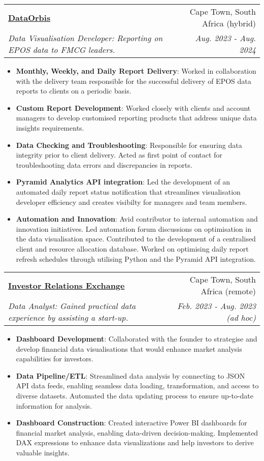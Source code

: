 \documentclass[a4paper,11pt]{article}
\makeatletter
\newcommand{\resumeItem}[2]{
  \item\small{
    \textbf{#1}{: #2 \vspace{-2pt}}
  }
}
\newcommand{\resumeSubheading}[4]{
  \vspace{-1pt}\item
    \begin{tabular*}{0.97\textwidth}[t]{l@{\extracolsep{\fill}}r}
      \textbf{#1} & #2 \\
      \textit{\small#3} & \textit{\small #4} \\
  \end{tabular*}\vspace{-10pt}
}
\newcommand{\resumeItemListStart}{\begin{itemize}}
\newcommand{\resumeItemListEnd}{\end{itemize}\vspace{-10pt}}
\makeatother
\begin{document}
    \resumeSubheading
      {\href{http://dataorbis.com}{DataOrbis}}{Cape Town, South Africa (hybrid)}
      {Data Visualisation Developer: Reporting on EPOS data to FMCG leaders.}{Aug. 2023 - Aug. 2024}
    
      \resumeItemListStart
        \resumeItem{Monthly, Weekly, and Daily Report Delivery}
          {Worked in collaboration with the delivery team responsible for the successful delivery of EPOS data reports to clients on a periodic basis.}
        \resumeItem{Custom Report Development}
          {Worked closely with clients and account managers to develop customised reporting products that address unique data insights requirements.}
        \resumeItem{Data Checking and Troubleshooting}
          {Responsible for ensuring data integrity prior to client delivery. Acted as first point of contact for troubleshooting data errors and discrepancies in reports.}
        \resumeItem{Pyramid Analytics API integration}
          {Led the development of an automated daily report status notification that streamlines visualisation developer efficiency and creates visibilty for managers and team members.}
        \resumeItem{Automation and Innovation}
          {Avid contributor to internal automation and innovation initiatives. Led automation forum discussions on optimisation in the data visualisation space. Contributed to the development of a centralised client and resource allocation database. Worked on optimising daily report refresh schedules through utilising Python and the Pyramid API integration.}
      \resumeItemListEnd

    \resumeSubheading
      {\href{http://irx.exchange/metals-gold}{Investor Relations Exchange}}{Cape Town, South Africa (remote)}
      {Data Analyst: Gained practical data experience by assisting a start-up.}{Feb. 2023 - Aug. 2023 (ad hoc)}
      
      \resumeItemListStart
        \resumeItem{Dashboard Development}
          {Collaborated with the founder to strategise and develop financial data visualisations that would enhance market analysis capabilities for investors.}
        \resumeItem{Data Pipeline/ETL}
          {Streamlined data analysis by connecting to JSON API data feeds, enabling seamless data loading, transformation, and access to diverse datasets. Automated the data updating process to ensure up-to-date information for analysis.}
        \resumeItem{Dashboard Construction}
          { Created interactive Power BI dashboards for financial market analysis, enabling data-driven decision-making. Implemented DAX expressions to enhance data visualizations and help investors to derive valuable insights.}
      \resumeItemListEnd
\end{document}
